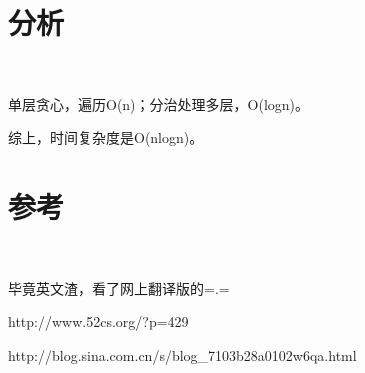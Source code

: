 \documentclass{article}
\begin{document}
	\section{分析}\
		
		单层贪心，遍历O(n)；分治处理多层，O(logn)。
		
		综上，时间复杂度是O(nlogn)。
	
	\section{参考}\
		
		毕竟英文渣，看了网上翻译版的=.=
		
		http://www.52cs.org/?p=429
		
		http://blog.sina.com.cn/s/blog\_7103b28a0102w6qa.html
		
	
\end{document}
